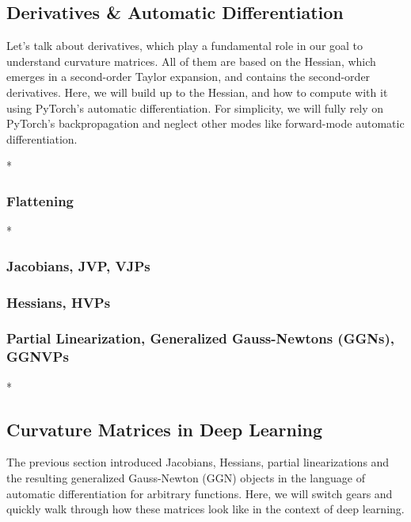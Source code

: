 \subsection{Derivatives \& Automatic Differentiation}\label{subsec:derivatives}
Let's talk about derivatives, which play a fundamental role in our goal to understand curvature matrices.
All of them are based on the Hessian, which emerges in a second-order Taylor expansion, and contains the second-order derivatives.
Here, we will build up to the Hessian, and how to compute with it using PyTorch's automatic differentiation.
For simplicity, we will fully rely on PyTorch's backpropagation and neglect other modes like forward-mode automatic differentiation.

\switchcolumn[0]*
\subsubsection{Flattening}


\switchcolumn[0]*
\subsubsection{Jacobians, JVP, VJPs}


\switchcolumn[0]
\subsubsection{Hessians, HVPs}


\switchcolumn[0]
\subsubsection{Partial Linearization, Generalized Gauss-Newtons (GGNs), GGNVPs}\label{sec:partial_linearization}


\switchcolumn[0]*
\subsection{Curvature Matrices in Deep Learning}\label{subsec:curvature-matrices}

The previous section introduced Jacobians, Hessians, partial linearizations and the resulting generalized Gauss-Newton (GGN) objects in the language of automatic differentiation for arbitrary functions.
Here, we will switch gears and quickly walk through how these matrices look like in the context of deep learning.

